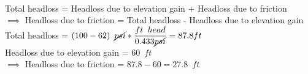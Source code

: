 \begin{enumerate}
\\
\vspace{0.2cm}
Total headloss = Headloss due to elevation gain + Headloss due to friction\\
\vspace{0.2cm}
$\implies$ Headloss due to friction = Total headloss - Headloss due to elevation gain\\
\vspace{0.2cm}
Total headloss = $(100 - 62)\enspace \cancel{psi}* \dfrac{ft \enspace head}{0.433\cancel{psi}}=87.8 ft $\\
Headloss due to elevation gain = $60 \enspace ft $\\
$\implies$ Headloss due to friction = $87.8-60=\boxed{27.8 \enspace ft}$\\
\vspace{0.2cm}
\end{enumerate}

